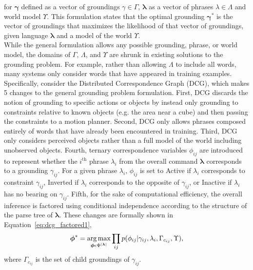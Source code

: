 \noindent for $\boldsymbol{\gamma}$ defined as a vector of groundings $\gamma \in \Gamma$, $\boldsymbol{\lambda}$ as a vector of phrases $\lambda \in \Lambda$ and world model $\Upsilon$. 
This formulation states that the optimal grounding $\boldsymbol{\gamma}^*$ is the vector of groundings that maximizes the likelihood of that vector of groundings, given language $\boldsymbol{\lambda}$ and a model of the world $\Upsilon$.\\
\indent While the general formulation allows any possible grounding, phrase, or world model, the domains of $\Gamma$, $\Lambda$, and $\Upsilon$ are shrunk in existing solutions to the grounding problem.
For example, rather than allowing $\Lambda$ to include all words, many systems only consider words that have appeared in training examples.\\
\indent Specifically, consider the Distributed Correspondence Graph (DCG), which makes 5 changes to the general grounding problem formulation.
First, DCG discards the notion of grounding to specific actions or objects by instead only grounding to constraints relative to known objects (e.g. the area near a cube) and then passing the constraints to a motion planner.
Second, DCG only allows phrases composed entirely of words that have already been encountered in training.
Third, DCG only considers perceived objects rather than a full model of the world including unobserved objects.
Fourth, ternary correspondence variables $\phi_{ij}$ are introduced to represent whether the $i^\text{th}$ phrase $\lambda_i$ from the overall command $\boldsymbol{\lambda}$ corresponds to a grounding $\gamma_{ij}$.
For a given phrase $\lambda_i$, $\phi_{ij}$ is set to Active if $\lambda_i$ corresponds to constraint $\gamma_{ij}$, Inverted if $\lambda_i$ corresponds to the opposite of $\gamma_{ij}$, or Inactive if $\lambda_i$ has no bearing on $\gamma_{ij}$.
Fifth, for the sake of computational efficiency, the overall inference is factored using conditional independence according to the structure of the parse tree of $\boldsymbol{\lambda}$.
These changes are formally shown in Equation~\ref{eq:dcg_factored1},
\begin{equation}
\label{eq:dcg_factored1}
\begin{split}
\boldsymbol{\phi}^* = \operatorname*{\arg\max}_{\boldsymbol{\phi} \epsilon \Phi^{|\boldsymbol{\lambda}|}} \prod_{ij} p(\phi_{ij}|\gamma_{ij},\lambda_i,\Gamma_{c_{ij}} , \Upsilon),
\end{split}
\end{equation}
where $\Gamma_{c_{ij}}$ is the set of child groundings of $\gamma_{ij}$.
